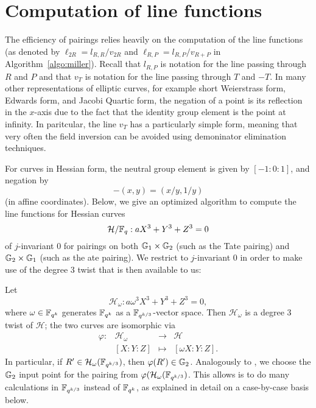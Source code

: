 \section{Computation of line functions}
\label{sec:lines}

The efficiency of pairings relies heavily on the computation of the line functions
(as denoted by $\ell_{2R} = l_{R,R}/v_{2R}$ and $\ell_{R,P} = l_{R,P}/v_{R+P}$ in Algorithm~\ref{algo:miller}).
Recall that $l_{R,P}$ is notation for the line passing through $R$ and $P$ and that
$v_{T}$ is notation for the line passing through $T$ and $-T$.
In many other representations of elliptic curves, for example short Weierstrass form,
Edwards form, and Jacobi Quartic form, the negation of a point is its reflection in the $x$-axis
due to the fact that the identity group element is the point at infinity.
In paritcular, the line $v_T$ has a particularly simple form, meaning that very often
the field inversion can be avoided using demoninator elimination techniques.

For curves in Hessian form, the neutral group element is given by $[-1:0:1]$,
and negation by
\[-(x,y) = (x/y,1/y)\]
(in affine coordinates).
Below, we give an optimized algorithm to compute the line functions for
Hessian curves 
\[\mathcal{H}/\mathbb{F}_{q}: aX^3 + Y^3 + Z^3 = 0\]
of $j$-invariant 0 
for pairings on both $\mathbb{G}_{1} \times \mathbb{G}_{2}$ (such as the Tate pairing)
and $\mathbb{G}_{2} \times \mathbb{G}_{1}$ (such as the ate pairing).
We restrict to $j$-invariant 0 in order to make use of the degree 3 twist that
is then available to us:

Let
$$ \mathcal{H}_{\omega}: a \omega^3 X^3 + Y^3 + Z^3 = 0, $$
where $\omega \in \mathbb{F}_{q^k} $ generates $\mathbb{F}_{q^k}$ as a $\mathbb{F}_{q^{k/3}}$-vector space.
Then $\mathcal{H}_{\omega}$ is a degree 3 twist of $\mathcal{H}$; the two curves are isomorphic via
\begin{equation}\label{twistiso}
\begin{array}{rccc}
\varphi: & \mathcal{H}_{\omega} & \rightarrow & \mathcal{H} \\
& [X:Y:Z] & \mapsto & [\omega X:Y:Z].
\end{array}
\end{equation}
In particular, if $R' \in \mathcal{H}_{\omega}(\mathbb{F}_{q^{k/3}})$, then
$\varphi(R') \in \mathbb{G}_{2}$.
Analogously to \cite{??}, we choose the $\mathbb{G}_{2}$ input point for the pairing
from $\varphi(\mathcal{H}_{\omega}(\mathbb{F}_{q^{k/3}})$.
This allows is to do many calculations in $\mathbb{F}_{q^{k/3}}$ instead of $\mathbb{F}_{q^k}$,
as explained in detail on a case-by-case basis below.

